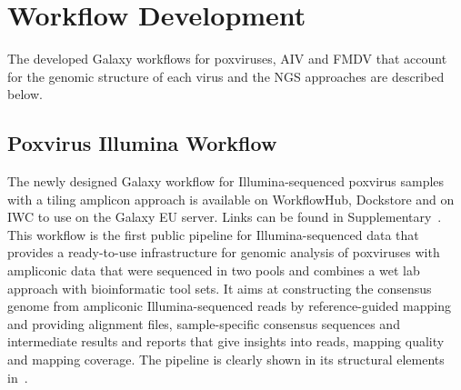 \section{Workflow Development}
The developed Galaxy workflows for poxviruses, \ac{AIV} and \ac{FMDV} that account for the genomic structure of each virus and the \ac{NGS} approaches are described below.

\subsection{Poxvirus Illumina Workflow}\label{sec:pox-wf}
The newly designed Galaxy workflow for Illumina-sequenced poxvirus samples with a tiling amplicon approach is available on WorkflowHub, Dockstore and on \ac{IWC} to use on the Galaxy EU server. Links can be found in Supplementary~. \\
This workflow is the first public pipeline for Illumina-sequenced data that provides a ready-to-use infrastructure for genomic analysis of poxviruses with ampliconic data that were sequenced in two pools and combines a wet lab approach with bioinformatic tool sets. It aims at constructing the consensus genome from ampliconic Illumina-sequenced reads by reference-guided mapping and providing alignment files, sample-specific consensus sequences and intermediate results and reports that give insights into reads, mapping quality and mapping coverage. The pipeline is clearly shown in its structural elements in~. \\ 

